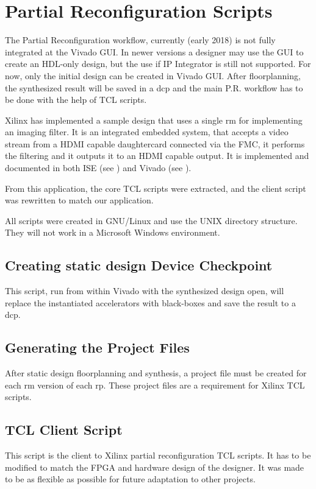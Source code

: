 \chapter{Partial Reconfiguration Scripts}

The Partial Reconfiguration workflow, currently (early 2018) is not fully integrated at the Vivado GUI.
In newer versions a designer may use the GUI to create an HDL-only design, but the use if IP Integrator
is still not supported. For now, only the initial design can be created in Vivado GUI.
After floorplanning, the synthesized result will be saved in a \gls{dcp} and the main P.R. workflow
has to be done with the help of TCL scripts. 

Xilinx has implemented a sample design that uses
a single \gls{rm} for implementing an imaging filter. It is an integrated embedded system,
that accepts a video stream from a HDMI capable daughtercard connected via the FMC,
it performs the filtering and it outputs it to an HDMI capable output. It is implemented and
documented in both ISE (see \cite{xapp1159}) and Vivado (see \cite{xapp1231}).

From this application, the core TCL scripts were extracted, and the client script
was rewritten to match our application.

All scripts were created in GNU/Linux and use the UNIX directory structure.
They will not work in a Microsoft Windows environment.

\section{Creating static design Device Checkpoint}
This script, run from within Vivado with the synthesized design open, 
will replace the instantiated accelerators with black-boxes and save
the result to a \gls{dcp}.



\section{Generating the Project Files}
After static design floorplanning and synthesis, a project file must be
created for each \gls{rm} version of each \gls{rp}.
These project files are a requirement for Xilinx TCL scripts.



\section{TCL Client Script}
This script is the client to Xilinx partial reconfiguration TCL scripts.
It has to be modified to match the FPGA and hardware design of the designer.
It was made to be as flexible as possible for future adaptation to other projects.

